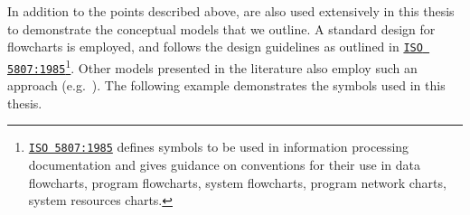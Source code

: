 \begin{preamble}
In addition to the points described above,  are also used extensively in this thesis to demonstrate the conceptual models that we outline. A standard design for flowcharts is employed, and follows the design guidelines as outlined in \href{https://www.iso.org/standard/11955.html}{\texttt{ISO 5807:1985}}\footnote{\href{https://www.iso.org/standard/11955.html}{\texttt{ISO 5807:1985}} defines symbols to be used in information processing documentation and gives guidance on conventions for their use in data flowcharts, program flowcharts, system flowcharts, program network charts, system resources charts.}. Other models presented in the literature also employ such an approach (e.g.~\cite{thomas2014modelling_behaviour}). The following example demonstrates the symbols used in this thesis.

\begin{figure}[h!]
    \centering
\end{figure}


\end{preamble}
